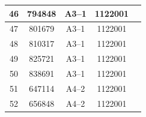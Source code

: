 \documentclass[UTF8,10pt,a4paper,fontset=fandol]{ctexart}
\newcommand{\fieldvalue}[1]{#1}
\begin{document}
\begin{center}
\begin{tabular}{|c|c|c|c|c|}
\fieldvalue{46} &
\fieldvalue{794848} &
\fieldvalue{A3--1} &
\fieldvalue{1122001} & \\ \hline

\fieldvalue{47} &
\fieldvalue{801679} &
\fieldvalue{A3--1} &
\fieldvalue{1122001} & \\ \hline

\fieldvalue{48} &
\fieldvalue{810317} &
\fieldvalue{A3--1} &
\fieldvalue{1122001} & \\ \hline

\fieldvalue{49} &
\fieldvalue{825721} &
\fieldvalue{A3--1} &
\fieldvalue{1122001} & \\ \hline

\fieldvalue{50} &
\fieldvalue{838691} &
\fieldvalue{A3--1} &
\fieldvalue{1122001} & \\ \hline

\fieldvalue{51} &
\fieldvalue{647114} &
\fieldvalue{A4--2} &
\fieldvalue{1122001} & \\ \hline

\fieldvalue{52} &
\fieldvalue{656848} &
\fieldvalue{A4--2} &
\fieldvalue{1122001} & \\ \hline


\end{tabular}
\end{center}
\end{document}
